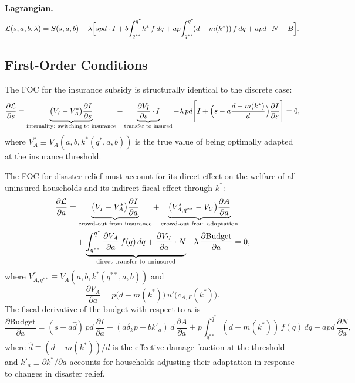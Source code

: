 \documentclass{article}
\begin{document}
\textbf{Lagrangian.}
\begin{equation}
    \mathcal{L}(s,a,b,\lambda) = S(s,a,b)
    - \lambda\Bigl[spd\cdot I + b\!\int_{q^{**}}^{q^*}\! k^*\,f\,dq
    + ap\!\int_{q^{**}}^{q^*}\!(d-m(k^*))\,f\,dq + apd\cdot N - B\Bigr].
\end{equation}

\subsection{First-Order Conditions}

The FOC for the insurance subsidy is structurally identical to the discrete case:
\begin{equation}
    \frac{\partial\mathcal{L}}{\partial s}
    =
    \underbrace{\bigl(V_I - V_A^*\bigr)\frac{\partial I}{\partial s}}_{\text{internality: switching to insurance}}
    + \underbrace{\frac{\partial V_I}{\partial s}\cdot I}_{\text{transfer to insured}}
    - \lambda\,pd\Biggl[I + \Bigl(s - a\frac{d - m(k^*)}{d}\Bigr)\frac{\partial I}{\partial s}\Biggr]
    = 0, \label{eq:foc_s_cont}
\end{equation}
where $V_A^* \equiv V_A(a,b,k^*(q^*,a,b))$ is the true value of being optimally adapted at the insurance threshold.

The FOC for disaster relief must account for its direct effect on the welfare of all uninsured households and its indirect fiscal effect through $k^*$:
\begin{align}
    \frac{\partial\mathcal{L}}{\partial a}
    &=
    \underbrace{\bigl(V_I - V_A^*\bigr)\frac{\partial I}{\partial a}}_{\text{crowd-out from insurance}}
    + \underbrace{\bigl(V_{A,q^{**}}^* - V_U\bigr)\frac{\partial A}{\partial a}}_{\text{crowd-out from adaptation}}
    \notag\\
    &\quad
    + \underbrace{\int_{q^{**}}^{q^*} \frac{\partial V_A}{\partial a}\,f(q)\,dq
    + \frac{\partial V_U}{\partial a}\cdot N}_{\text{direct transfer to uninsured}}
    - \lambda\,\frac{\partial\text{Budget}}{\partial a}
    = 0, \label{eq:foc_a_cont}
\end{align}
where $V_{A,q^{**}}^* \equiv V_A(a,b,k^*(q^{**},a,b))$ and
\begin{equation}
    \frac{\partial V_A}{\partial a} = p\bigl(d-m(k^*)\bigr)\,u'\!\bigl(c_{A,F}(k^*)\bigr).
\end{equation}
The fiscal derivative of the budget with respect to $a$ is
\begin{equation}
    \frac{\partial\text{Budget}}{\partial a}
    = (s-a\hat{d})\,pd\,\frac{\partial I}{\partial a}
    + (a\delta_k p - bk'_a)\,d\,\frac{\partial A}{\partial a}
    + p\!\int_{q^{**}}^{q^*}\!(d-m(k^*))\,f(q)\,dq
    + apd\,\frac{\partial N}{\partial a}, \label{eq:budget_deriv_a}
\end{equation}
where $\hat{d} \equiv (d-m(k^*))/d$ is the effective damage fraction at the threshold and $k'_a \equiv \partial k^*/\partial a$ accounts for households adjusting their adaptation in response to changes in disaster relief.
\end{document}
